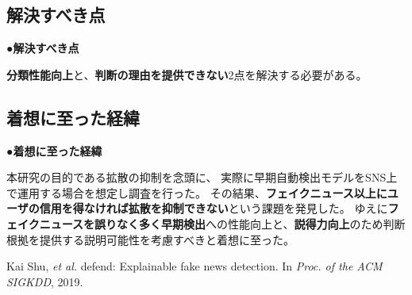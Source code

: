{	\subsection{解決すべき点}
	\noindent
	●\textbf{解決すべき点}

	\textbf{分類性能向上}と、\textbf{判断の理由を提供できない}2点を解決する必要がある。

	\subsection{着想に至った経緯}
	\noindent
	●\textbf{着想に至った経緯}

	本研究の目的である拡散の抑制を念頭に、
	実際に早期自動検出モデルをSNS上で運用する場合を想定し調査を行った。
	その結果、\textbf{フェイクニュース以上にユーザの信用を得なければ拡散を抑制できない}という課題を発見した。
	ゆえに\textbf{フェイクニュースを誤りなく多く早期検出}への性能向上と、\textbf{説得力向上}のため判断根拠を提供する説明可能性を考慮すべきと着想に至った。

	{\footnotesize
		\begin{thebibliography}{99}
			\vspace*{-1mm}
			\setlength{\parskip}{0cm}
			\setlength{\itemsep}{0cm}
			\setcounter{enumiv}{6}
			\begin{spacing}{0.7}
				 Kai Shu, \textit{et al.} defend: Explainable fake news detection. In \textit{Proc. of the ACM SIGKDD}, 2019.
			\end{spacing}
			\end{thebibliography}
			
	}
}

